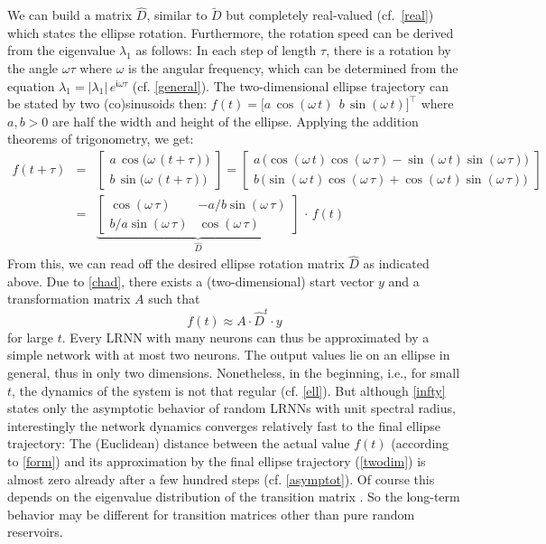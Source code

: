 \documentclass{sn-jnl}
\theoremstyle{definition}
\begin{document}
We can build a matrix $\hat{D}$, similar to $\tilde{D}$ but completely
real-valued (cf.~\cref{real}) which states the ellipse rotation. Furthermore,
the rotation speed can be derived from the eigenvalue $\lambda_1$ as follows: In each step
of length $\tau$, there is a rotation by the angle $\omega\tau$ where $\omega$
is the angular frequency, which can be determined from the equation $\lambda_1 =
|\lambda_1|\,e^{\mathfrak{i}\omega\tau}$ (cf. \cref{general}). The
two-dimensional ellipse trajectory can be stated by two (co)sinusoids then:
$f(t) = \big[ a\,\cos(\omega\,t) ~~ b\,\sin(\omega\,t) \big]^\top$ where $a,b >
0$ are half the width and height of the ellipse. Applying the addition theorems
of trigonometry, we get:
\begin{eqnarray*}
	f(t+\tau) & = &
	\left[ \begin{array}{c} a\,\cos\!\big(\omega\,(t+\tau)\big) \\ b\,\sin\!\big(\omega\,(t+\tau)\big) \end{array} \right]  = 
	\left[ \begin{array}{c}
		a\,\big(\!\cos(\omega\,t) \cos(\omega\,\tau) - \sin(\omega\,t) \sin(\omega\,\tau) \big) \\
		b\,\big(\!\sin(\omega\,t) \cos(\omega\,\tau) + \cos(\omega\,t) \sin(\omega\,\tau) \big)
	\end{array} \right] \\ & = &
	\underbrace{\left[ \begin{array}{cc}
		\cos(\omega\,\tau) & -a/b \sin(\omega\,\tau) \\
		b/a \sin(\omega\,\tau) & \cos(\omega\,\tau)
	\end{array} \right]}_{\displaystyle\hat{D}}\,\cdot\,f(t)
\end{eqnarray*}
From this, we can read off the desired ellipse rotation matrix $\hat{D}$ as
indicated above. Due to \cref{chad}, there exists a (two-dimensional) start
vector $y$ and a transformation matrix $A$ such that
\begin{equation}\label{twodim}
	f(t) \approx A \cdot \hat{D}^t \cdot y
\end{equation}
for large $t$. Every LRNN with many neurons can thus be approximated by a simple
network with at most two neurons. The output values lie on an ellipse in
general, thus in only two dimensions. Nonetheless, in the beginning, i.e., for
small $t$, the dynamics of the system is not that regular (cf. \cref{ell}). But
although \cref{infty} states only the asymptotic behavior of random LRNNs with
unit spectral radius, interestingly the network dynamics converges relatively
fast to the final ellipse trajectory: The (Euclidean) distance between the
actual value $f(t)$ (according to \cref{form}) and its approximation by the
final ellipse trajectory (\cref{twodim}) is almost zero already after a few
hundred steps (cf. \cref{asymptot}). Of course this depends on the eigenvalue
distribution of the transition matrix \citep{TV10}. So the long-term behavior
may be different for transition matrices other than pure random reservoirs.
\end{document}
